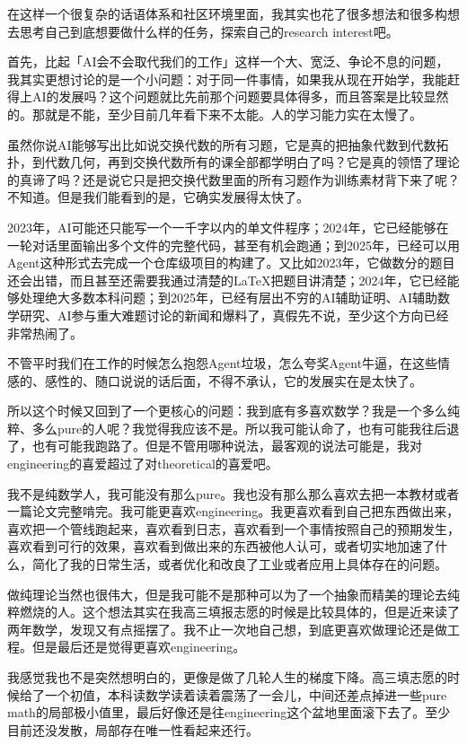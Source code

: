 在这样一个很复杂的话语体系和社区环境里面，我其实也花了很多想法和很多构想去思考自己到底想要做什么样的任务，探索自己的research interest吧。

首先，比起「AI会不会取代我们的工作」这样一个大、宽泛、争论不息的问题，我其实更想讨论的是一个小问题：对于同一件事情，如果我从现在开始学，我能赶得上AI的发展吗？这个问题就比先前那个问题要具体得多，而且答案是比较显然的。那就是不能，至少目前几年看下来不太能。人的学习能力实在太慢了。

虽然你说AI能够写出比如说交换代数的所有习题，它是真的把抽象代数到代数拓扑，到代数几何，再到交换代数所有的课全部都学明白了吗？它是真的领悟了理论的真谛了吗？还是说它只是把交换代数里面的所有习题作为训练素材背下来了呢？不知道。但是我们能看到的是，它确实发展得太快了。

2023年，AI可能还只能写一个一千字以内的单文件程序；2024年，它已经能够在一轮对话里面输出多个文件的完整代码，甚至有机会跑通；到2025年，已经可以用Agent这种形式去完成一个仓库级项目的构建了。又比如2023年，它做数分的题目还会出错，而且甚至还需要我通过清楚的LaTeX把题目讲清楚；2024年，它已经能够处理绝大多数本科问题；到2025年，已经有层出不穷的AI辅助证明、AI辅助数学研究、AI参与重大难题讨论的新闻和爆料了，真假先不说，至少这个方向已经非常热闹了。

不管平时我们在工作的时候怎么抱怨Agent垃圾，怎么夸奖Agent牛逼，在这些情感的、感性的、随口说说的话后面，不得不承认，它的发展实在是太快了。

所以这个时候又回到了一个更核心的问题：我到底有多喜欢数学？我是一个多么纯粹、多么pure的人呢？我觉得我应该不是。所以我可能认命了，也有可能我往后退了，也有可能我跑路了。但是不管用哪种说法，最客观的说法可能是，我对engineering的喜爱超过了对theoretical的喜爱吧。

我不是纯数学人，我可能没有那么pure。我也没有那么那么喜欢去把一本教材或者一篇论文完整啃完。我可能更喜欢engineering。我更喜欢看到自己把东西做出来，喜欢把一个管线跑起来，喜欢看到日志，喜欢看到一个事情按照自己的预期发生，喜欢看到可行的效果，喜欢看到做出来的东西被他人认可，或者切实地加速了什么，简化了我的日常生活，或者优化和改良了工业或者应用上具体存在的问题。

做纯理论当然也很伟大，但是我可能不是那种可以为了一个抽象而精美的理论去纯粹燃烧的人。这个想法其实在我高三填报志愿的时候是比较具体的，但是近来读了两年数学，发现又有点摇摆了。我不止一次地自己想，到底更喜欢做理论还是做工程。但是最后还是觉得更喜欢engineering。

我感觉我也不是突然想明白的，更像是做了几轮人生的梯度下降。高三填志愿的时候给了一个初值，本科读数学读着读着震荡了一会儿，中间还差点掉进一些pure math的局部极小值里，最后好像还是往engineering这个盆地里面滚下去了。至少目前还没发散，局部存在唯一性看起来还行。

